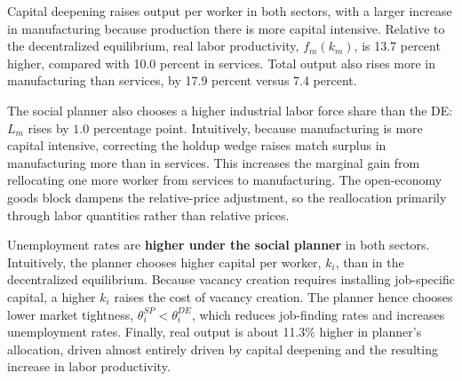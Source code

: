 \documentclass[12pt]{article} %
\theoremstyle{definition}
\begin{document}
Capital deepening raises output per worker in both sectors, with a larger increase in manufacturing because production there is more capital intensive.  Relative to the decentralized equilibrium, real labor productivity, $f_m(k_m)$,  is 13.7 percent higher, compared with 10.0 percent in services. Total output also rises more in  manufacturing  than services, by 17.9 percent versus 7.4 percent. 






The social planner also  chooses a higher industrial labor force share than the DE: $L_m$ rises by $1.0$ percentage point.  Intuitively, because manufacturing is more capital intensive, correcting the holdup wedge raises match surplus in manufacturing more than in services. This increases the marginal gain from  rellocating one more worker from services to manufacturing. The open-economy goods block dampens the relative-price adjustment, so the reallocation primarily through labor quantities rather than relative prices. 



Unemployment rates are \textbf{higher under the social planner} in both sectors. Intuitively, the planner chooses higher capital per worker, $k_i$, than in the decentralized equilibrium.  Because vacancy creation requires installing job-specific capital, a higher $k_i$ raises the cost of vacancy creation.  The planner hence chooses lower market tightness,  $\theta_i^{SP}< \theta_i^{DE}$, which reduces job-finding rates and increases unemployment rates. Finally, real output is about 11.3\% higher in planner's allocation, driven almost entirely driven by capital deepening and the resulting increase in labor productivity. %
\end{document}
